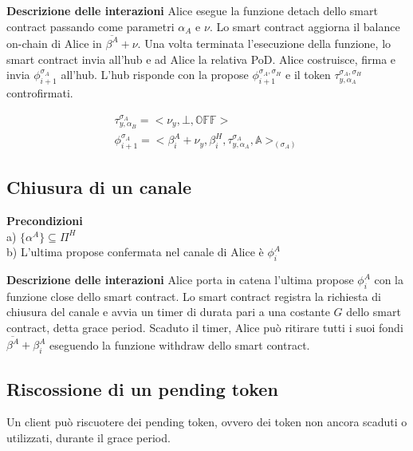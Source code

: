 \documentclass[12pt,italian,]{book}
\begin{document}
\textbf{\textbf{Descrizione delle interazioni}} Alice esegue la funzione detach dello smart contract passando come parametri \(\alpha_A\) e \(\nu\). Lo smart contract aggiorna il balance on-chain di Alice in \(\overline{\beta^A}+\nu\). Una volta terminata l'esecuzione della funzione, lo smart contract invia all'hub e ad Alice la relativa PoD. Alice costruisce, firma e invia \(\phi^{\sigma_A}_{i+1}\) all'hub. L'hub risponde con la propose \(\phi^{\sigma_A,\sigma_H}_{i+1}\) e il token \(\tau^{\sigma_A,\sigma_H}_{y, \alpha_A}\) controfirmati.

\begin{equation}
\begin{aligned}
\label{Propose detach pagamento OffChain-OffChain}
\tau^{\sigma_A}_{y, \alpha_B} =  <\nu_y, \bot, \mathbb{OFF}>\\
\phi^{\sigma_A}_{i+1} = <\beta^A_i+\nu_y, \beta^H_i, \tau^{\sigma_A}_{y, \alpha_A} ,\mathbb{A}>_(\sigma_A)
\end{aligned}
\end{equation}

\hypertarget{chiusura-di-un-canale}{%
\subsection{Chiusura di un canale}\label{chiusura-di-un-canale}}

\textbf{\textbf{Precondizioni}}\\
a) \(\{\alpha^A\} \subseteq \Pi^H\)\\
b) L'ultima propose confermata nel canale di Alice è \(\phi^A_i\)

\textbf{\textbf{Descrizione delle interazioni}} Alice porta in catena l'ultima propose \(\phi^A_i\) con la funzione close dello smart contract. Lo smart contract registra la richiesta di chiusura del canale e avvia un timer di durata pari a una costante \(G\) dello smart contract, detta grace period. Scaduto il timer, Alice può ritirare tutti i suoi fondi \(\overline{\beta^A}+\beta^A_{i}\) eseguendo la funzione withdraw dello smart contract.

\hypertarget{riscossione-di-un-pending-token}{%
\subsection{Riscossione di un pending token}\label{riscossione-di-un-pending-token}}

Un client può riscuotere dei pending token, ovvero dei token non ancora scaduti o utilizzati, durante il grace period.
\end{document}
